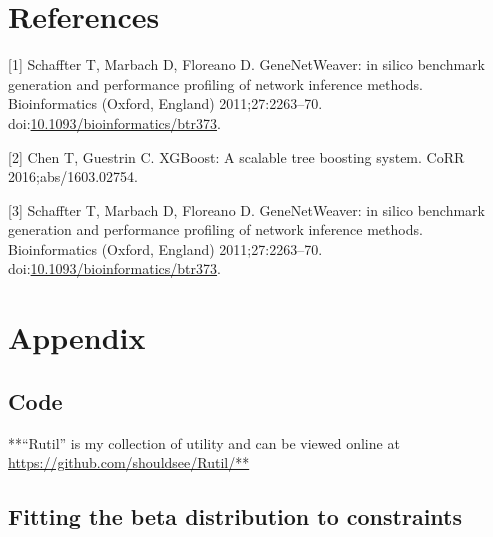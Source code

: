 \documentclass[]{article}
\theoremstyle{definition}
\theoremstyle{definition}
\theoremstyle{definition}
\theoremstyle{remark}
\begin{document}
\section{References}\label{references}

\hypertarget{refs}{}
\hypertarget{ref-gnw}{}
{[}1{]} Schaffter T, Marbach D, Floreano D. GeneNetWeaver: in silico
benchmark generation and performance profiling of network inference
methods. Bioinformatics (Oxford, England) 2011;27:2263--70.
doi:\href{https://doi.org/10.1093/bioinformatics/btr373}{10.1093/bioinformatics/btr373}.

\hypertarget{ref-xgboost}{}
{[}2{]} Chen T, Guestrin C. XGBoost: A scalable tree boosting system.
CoRR 2016;abs/1603.02754.

\hypertarget{ref-GENIE3}{}
{[}3{]} Schaffter T, Marbach D, Floreano D. GeneNetWeaver: in silico
benchmark generation and performance profiling of network inference
methods. Bioinformatics (Oxford, England) 2011;27:2263--70.
doi:\href{https://doi.org/10.1093/bioinformatics/btr373}{10.1093/bioinformatics/btr373}.

\section{Appendix}\label{appendix}

\subsection{Code}\label{code}

**``Rutil'' is my collection of utility and can be viewed online at
\url{https://github.com/shouldsee/Rutil/**}

\subsection{Fitting the beta distribution to
constraints}\label{fitting-the-beta-distribution-to-constraints}
\end{document}
